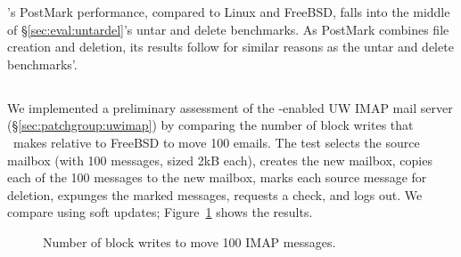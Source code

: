 \Kudos's PostMark performance, compared to Linux and FreeBSD, falls
into the middle of \S\ref{sec:eval:untardel}'s untar and delete
benchmarks. As PostMark combines file creation and deletion, its
results follow for similar reasons as the untar and delete benchmarks'.

\subsection {\Patchgroups}


%

\label{sec:evaluation:uwimap}
We implemented a preliminary assessment of the \patchgroup-enabled UW IMAP mail server
(\S\ref{sec:patchgroup:uwimap}) by comparing the number of block writes
that \Kudos\ makes relative to FreeBSD to move 100 emails. The test
selects the source mailbox (with 100 messages, sized 2kB each),
creates the new mailbox, copies each of the 100 messages to the new
mailbox, marks each source message for deletion, expunges the marked
messages, requests a check, and logs out. We compare using soft updates;
Figure~\ref{fig:imap-compare} shows the results.

\begin{figure}[t]
\caption{\label{fig:imap-compare} Number of block writes to move 100
  IMAP messages.}
\end{figure}
